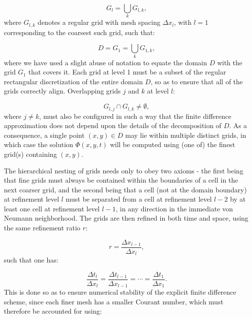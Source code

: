 \documentclass{article}
\begin{document}
\begin{equation}
G_l = \bigcup_k G_{l, k},
\end{equation}
where ${G_{l, k}}$ denotes a regular grid with mesh spacing ${\Delta x_l}$, with ${l = 1}$ corresponding to the coarsest such grid, such that:

\begin{equation}
D = G_1 = \bigcup_{k} G_{1, k},
\end{equation}
where we have used a slight abuse of notation to equate the domain $D$ with the grid ${G_1}$ that covers it. Each grid at level 1 must be a subset of the regular rectangular discretization of the entire domain $D$, so as to ensure that all of the grids correctly align. Overlapping grids $j$ and $k$ at level $l$:

\begin{equation}
G_{l, j} \cap G_{l, k} \neq \emptyset,
\end{equation}
where ${j \neq k}$, must also be configured in such a way that the finite difference approximation does not depend upon the details of the decomposition of $D$. As a consequence, a single point ${\left( x, y \right) \in D}$ may lie within multiple distinct grids, in which case the solution ${\Phi \left( x, y, t \right)}$ will be computed using (one of) the finest grid(s) containing ${\left( x, y \right)}$.

The hierarchical nesting of grids needs only to obey two axioms - the first being that fine grids must always be contained within the boundaries of a cell in the next coarser grid, and the second being that a cell (not at the domain boundary) at refinement level $l$ must be separated from a cell at refinement level ${l - 2}$ by at least one cell at refinement level ${l - 1}$, in any direction in the immediate von Neumann neighborhood. The grids are then refined in both time and space, using the same refinement ratio $r$:

\begin{equation}
r = \frac{\Delta x_{l - 1}}{\Delta x_l},
\end{equation}
such that one has:

\begin{equation}
\frac{\Delta t_l}{\Delta x_l} = \frac{\Delta t_{l - 1}}{\Delta x_{l - 1}} = \cdots = \frac{\Delta t_1}{\Delta x_1}.
\end{equation}
This is done so as to ensure numerical stability of the explicit finite difference scheme, since each finer mesh has a smaller Courant number, which must therefore be accounted for using:
\end{document}
